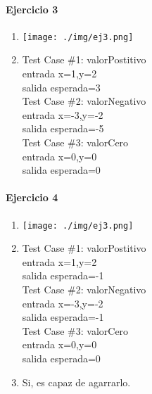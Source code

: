 \documentclass{article}
\begin{document}
\paragraph{Ejercicio 3}

\begin{multicols}{2}
\begin{enumerate}
\item \texttt{[image: ./img/ej3.png]}
\item 
Test Case \#1: valorPostitivo\\
\hspace*{6mm}entrada x=1,y=2\\
\hspace*{6mm}salida esperada=3\medskip\\
Test Case \#2: valorNegativo\\
\hspace*{6mm}entrada x=-3,y=-2\\
\hspace*{6mm}salida esperada=-5\medskip\\
Test Case \#3: valorCero\\
\hspace*{6mm}entrada x=0,y=0\\
\hspace*{6mm}salida esperada=0\medskip\\
\end{enumerate}
\end{multicols}

\paragraph{Ejercicio 4}

\begin{multicols}{2}
\begin{enumerate}
\item \texttt{[image: ./img/ej3.png]}
\item 
Test Case \#1: valorPostitivo\\
\hspace*{6mm}entrada x=1,y=2\\
\hspace*{6mm}salida esperada=-1\medskip\\
Test Case \#2: valorNegativo\\
\hspace*{6mm}entrada x=-3,y=-2\\
\hspace*{6mm}salida esperada=-1\medskip\\
Test Case \#3: valorCero\\
\hspace*{6mm}entrada x=0,y=0\\
\hspace*{6mm}salida esperada=0\medskip\\
\item Si, es capaz de agarrarlo.
\end{enumerate}
\end{multicols}
\end{document}
